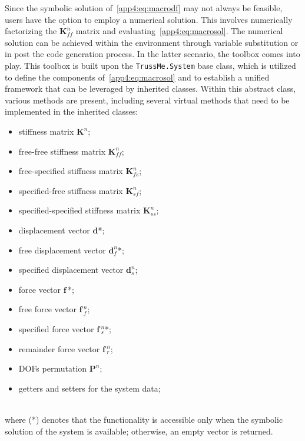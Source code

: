 Since the symbolic solution of~\eqref{app4:eq:macrodf} may not always be feasible, users have the option to employ a numerical solution. This involves numerically factorizing the $\mathbf{K}^{n}_{ff}$ matrix and evaluating~\eqref{app4:eq:macrosol}. The numerical solution can be achieved within the \Maple{} environment through variable substitution or in \Matlab{} post the code generation process. In the latter scenario, the \TrussMe{} \Matlab{} toolbox comes into play. This toolbox is built upon the \texttt{TrussMe.System} base class, which is utilized to define the components of~\eqref{app4:eq:macrosol} and to establish a unified framework that can be leveraged by inherited classes. Within this abstract class, various methods are present, including several virtual methods that need to be implemented in the inherited classes: \\[0.5em]
%
\begin{minipage}[t]{0.49\textwidth}
  \begin{itemize}
  \setlength{\itemsep}{0.0em}
  \item stiffness matrix $\mathbf{K}^{n}$;
  \item free-free stiffness matrix $\mathbf{K}^{n}_{ff}$;
  \item free-specified stiffness matrix $\mathbf{K}^{n}_{fs}$;
  \item specified-free stiffness matrix $\mathbf{K}^{n}_{sf}$;
  \item specified-specified stiffness matrix $\mathbf{K}^{n}_{ss}$;
  \item displacement vector $\mathbf{d}$*;
  \item free displacement vector $\mathbf{d}^{n}_{f}$*;
  \end{itemize}
\end{minipage}
\hfill
\begin{minipage}[t]{0.49\textwidth}
  \begin{itemize}
  \setlength{\itemsep}{0.0em}
  \item specified displacement vector $\mathbf{d}^{n}_{s}$;
  \item force vector $\mathbf{f}$\,*;
  \item free force vector $\mathbf{f}{\,}^{n}_{f}$;
  \item specified force vector $\mathbf{f}{\,}^{n}_{s}$*;
  \item remainder force vector $\mathbf{f}{\,}^{n}_{r}$;
  \item \acp{DOF} permutation $\mathbf{P}^{n}$;
  \item getters and setters for the system data;
  \end{itemize}
\end{minipage} \\[0.5em]
%
where (*) denotes that the functionality is accessible only when the symbolic solution of the system is available; otherwise, an empty vector is returned.

